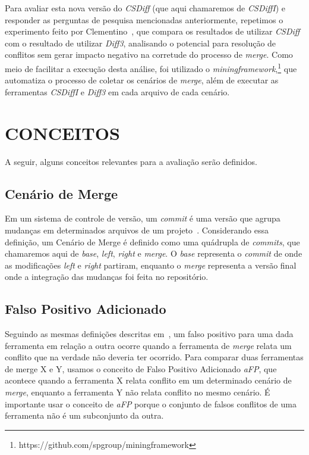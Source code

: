 Para avaliar esta nova versão do \emph{CSDiff} (que aqui chamaremos de
\emph{CSDiffI}) e responder as perguntas de pesquisa mencionadas anteriormente,
repetimos o experimento feito por Clementino~\cite{heitor21,clem21}, que
compara os resultados de utilizar \emph{CSDiff} com o resultado de utilizar
\emph{Diff3}, analisando o potencial para resolução de conflitos sem gerar
impacto negativo na corretude do processo de \emph{merge}. Como meio de
facilitar a execução desta análise, foi utilizado o
\emph{miningframework},\footnote{https://github.com/spgroup/miningframework}
que automatiza o processo de coletar os cenários de \emph{merge}, além de
executar as ferramentas \emph{CSDiffI} e \emph{Diff3} em cada arquivo de cada
cenário.

\section{CONCEITOS}\label{conceitos}
A seguir, alguns conceitos relevantes para a avaliação serão definidos.

\subsection{Cenário de Merge}
Em um sistema de controle de versão, um \emph{commit} é uma versão que agrupa
mudanças em determinados arquivos de um projeto~\cite{koc11}. Considerando essa
definição, um Cenário de Merge é definido como uma quádrupla de \emph{commits},
que chamaremos aqui de \emph{base}, \emph{left}, \emph{right} e \emph{merge}. O
\emph{base} representa o \emph{commit} de onde as modificações \emph{left} e
\emph{right} partiram, enquanto o \emph{merge} representa a versão final onde a
integração das mudanças foi feita no repositório.

\subsection{Falso Positivo Adicionado}

Seguindo as mesmas definições descritas em~\cite{heitor21}, um falso positivo
para uma dada ferramenta em relação a outra ocorre quando a ferramenta de
\emph{merge} relata um conflito que na verdade não deveria ter ocorrido. Para
comparar duas ferramentas de merge X e Y, usamos o conceito de Falso Positivo
Adicionado \emph{aFP}, que acontece quando a ferramenta X relata conflito em um
determinado cenário de \emph{merge}, enquanto a ferramenta Y não relata
conflito no mesmo cenário. É importante usar o conceito de \emph{aFP} porque o
conjunto de falsos conflitos de uma ferramenta não é um subconjunto da outra.

